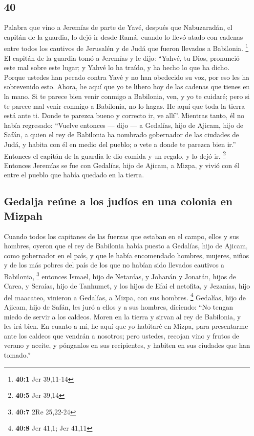 \begin{paracol}{2}
\hypertarget{section-78}{%
\section{40}\label{section-78}}

 Palabra que vino a Jeremías de parte de Yavé, después que
Nabuzaradán, el capitán de la guardia, lo dejó ir desde Ramá, cuando lo
llevó atado con cadenas entre todos los cautivos de Jerusalén y de Judá
que fueron llevados a Babilonia. \footnote{\textbf{40:1} Jer 39,11-14}
 El capitán de la guardia tomó a Jeremías y le dijo:
``Yahvé, tu Dios, pronunció este mal sobre este lugar;  y
Yahvé lo ha traído, y ha hecho lo que ha dicho. Porque ustedes han
pecado contra Yavé y no han obedecido su voz, por eso les ha sobrevenido
esto.  Ahora, he aquí que yo te libero hoy de las cadenas
que tienes en la mano. Si te parece bien venir conmigo a Babilonia, ven,
y yo te cuidaré; pero si te parece mal venir conmigo a Babilonia, no lo
hagas. He aquí que toda la tierra está ante ti. Donde te parezca bueno y
correcto ir, ve allí''.  Mientras tanto, él no había
regresado: ``Vuelve entonces --- dijo --- a Gedalías, hijo de Ajicam,
hijo de Safán, a quien el rey de Babilonia ha nombrado gobernador de las
ciudades de Judá, y habita con él en medio del pueblo; o vete a donde te
parezca bien ir.'' Entonces el capitán de la guardia le dio comida y un
regalo, y lo dejó ir. \footnote{\textbf{40:5} Jer 39,14} 
Entonces Jeremías se fue con Gedalías, hijo de Ajicam, a Mizpa, y vivió
con él entre el pueblo que había quedado en la tierra.

\hypertarget{gedalja-reuxfane-a-los-juduxedos-en-una-colonia-en-mizpah}{%
\subsection{Gedalja reúne a los judíos en una colonia en
Mizpah}\label{gedalja-reuxfane-a-los-juduxedos-en-una-colonia-en-mizpah}}

 Cuando todos los capitanes de las fuerzas que estaban en
el campo, ellos y sus hombres, oyeron que el rey de Babilonia había
puesto a Gedalías, hijo de Ajicam, como gobernador en el país, y que le
había encomendado hombres, mujeres, niños y de los más pobres del país
de los que no habían sido llevados cautivos a Babilonia, \footnote{\textbf{40:7}
  2Re 25,22-24}  entonces Ismael, hijo de Netanías, y
Johanán y Jonatán, hijos de Carea, y Seraías, hijo de Tanhumet, y los
hijos de Efai el netofita, y Jezanías, hijo del maacateo, vinieron a
Gedalías, a Mizpa, con sus hombres. \footnote{\textbf{40:8} Jer 41,1;
  Jer 41,11}  Gedalías, hijo de Ajicam, hijo de Safán, les
juró a ellos y a sus hombres, diciendo: ``No tengan miedo de servir a
los caldeos. Moren en la tierra y sirvan al rey de Babilonia, y les irá
bien.  En cuanto a mí, he aquí que yo habitaré en Mizpa,
para presentarme ante los caldeos que vendrán a nosotros; pero ustedes,
recojan vino y frutos de verano y aceite, y pónganlos en sus
recipientes, y habiten en sus ciudades que han tomado.''


\end{paracol}
